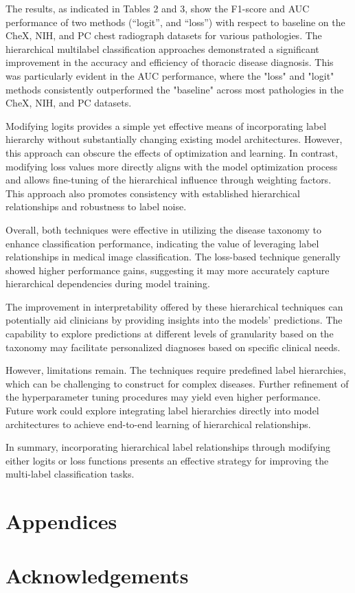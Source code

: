 The results, as indicated in Tables 2 and 3, show the F1-score and AUC performance of two methods (“logit”, and “loss”) with respect to baseline on the CheX, NIH, and PC chest radiograph datasets for various pathologies. The hierarchical multilabel classification approaches demonstrated a significant improvement in the accuracy and efficiency of thoracic disease diagnosis. This was particularly evident in the AUC performance, where the "loss" and "logit" methods consistently outperformed the "baseline" across most pathologies in the CheX, NIH, and PC datasets.

Modifying logits provides a simple yet effective means of incorporating label hierarchy without substantially changing existing model architectures. However, this approach can obscure the effects of optimization and learning. In contrast, modifying loss values more directly aligns with the model optimization process and allows fine-tuning of the hierarchical influence through weighting factors. This approach also promotes consistency with established hierarchical relationships and robustness to label noise.

Overall, both techniques were effective in utilizing the disease taxonomy to enhance classification performance, indicating the value of leveraging label relationships in medical image classification. The loss-based technique generally showed higher performance gains, suggesting it may more accurately capture hierarchical dependencies during model training.

The improvement in interpretability offered by these hierarchical techniques can potentially aid clinicians by providing insights into the models' predictions. The capability to explore predictions at different levels of granularity based on the taxonomy may facilitate personalized diagnoses based on specific clinical needs.

However, limitations remain. The techniques require predefined label hierarchies, which can be challenging to construct for complex diseases. Further refinement of the hyperparameter tuning procedures may yield even higher performance. Future work could explore integrating label hierarchies directly into model architectures to achieve end-to-end learning of hierarchical relationships.

In summary, incorporating hierarchical label relationships through modifying either logits or loss functions presents an effective strategy for improving the multi-label classification tasks. 

\section*{Appendices}
\section*{Acknowledgements}

